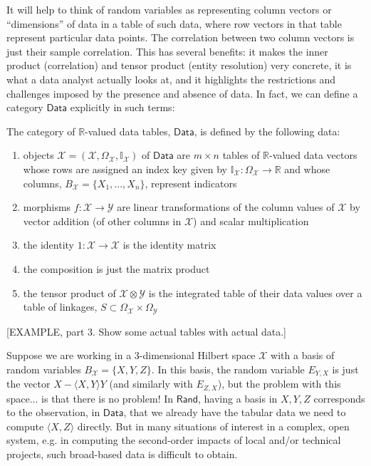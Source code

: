\documentclass[sigconf]{acmart}
\let\olddagger\dagger
\renewcommand{\dagger}{\ensuremath{\olddagger}\xspace}
\newcommand{\redout}[1]{{\color{red}#1}}
\newcommand{\Cat}[1]{\mathsf{#1}}
\def\Rand{\Cat{Rand}}
\def\Data{\Cat{Data}}
\begin{document}
It will help to think of random variables as representing column vectors or ``dimensions'' of data in a table of such data, where row vectors in that table represent particular data points. The correlation between two column vectors is just their sample correlation. This has several benefits: it makes the inner product (correlation) and tensor product (entity resolution) very concrete, it is what a data analyst actually looks at, and it highlights the restrictions and challenges imposed by the presence and absence of data. In fact, we can define a category $\Data$ explicitly in such terms:
\begin{definition}
The category of $\mathbb{R}$-valued data tables, $\Data$, is defined by the following data:
\begin{enumerate}
\item objects $\mathcal{X} = (\mathcal{X}, \Omega_\mathcal{X}, \mathbb{I}_\mathcal{X})$ of $\Data$ are $m \times n$ tables of $\mathbb{R}$-valued data vectors whose rows are assigned an index key given by $\mathbb{I}_\mathcal{X} : \Omega_\mathcal{X} \to \mathbb{R}$ and whose columns, $B_\mathcal{X} = \{X_1, ..., X_n\}$, represent indicators
\item morphisms $f: \mathcal{X} \to \mathcal{Y}$ are linear transformations of the column values of $\mathcal{X}$ by vector addition (of other columns in $\mathcal{X}$) and scalar multiplication
\item the identity $1 : \mathcal{X} \to \mathcal{X}$ is the identity matrix
\item the composition is just the matrix product
\item the tensor product of $\mathcal{X} \otimes \mathcal{Y}$ is the integrated table of their data values over a table of linkages, $S \subset \Omega_\mathcal{X} \times \Omega_\mathcal{Y}$
\end{enumerate}
\end{definition}

\redout{[EXAMPLE, part 3. Show some actual tables with actual data.]}

Suppose we are working in a 3-dimensional Hilbert space $\mathcal{X}$ with a basis of random variables $B_\mathcal{X}=\{ X, Y, Z\}$. In this basis, the random variable $E_{Y,X}$ is just the vector $X - \langle X,Y \rangle Y$ (and similarly with $E_{Z,X}$), but the problem with this space... is that there is no problem! In $\Rand$, having a basis in $X,Y,Z$ corresponds to the observation, in $\Data$, that we already have the tabular data we need to compute $\langle X, Z \rangle$ directly. But in many situations of interest in a complex, open system, e.g. in computing the second-order impacts of local and/or technical projects, such broad-based data is difficult to obtain. 
\end{document}
